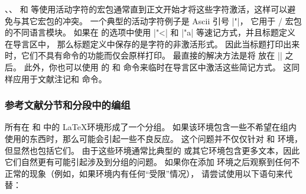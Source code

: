 、、 和  等使用活动字符的宏包通常直到正文开始才将这些字符激活，这样可以避免与其它宏包的冲突。
一个典型的活动字符例子是 Ascii 引号 |"|，
它用于 / 宏包的不同语言模块。
如果在  的选项中使用 |"<| 和 |"a| 等速记方式，并且标题定义在导言区中，
那么标题定义中保存的是字符的非激活形式。
因此当标题打印出来时，它们不具有命令的功能而仅会原样打印。
最直接的解决方法是将  放在  || 之后。
此外，你也可以使用  的  和  命令来临时在导言区中激活这些简记方式。
这同样应用于文献注记和  命令。

\subsubsection{参考文献分节和分段中的编组}%
\label{use:cav:grp}


所有在  和  中的 \LaTeX 环境形成了一个分组。
如果该环境包含一些不希望在组内使用的东西时，那么可能会引起一些不良反应。
这个问题并不仅仅针对  和  环境，但显然也包括它们。
由于这些环境通常比典型的  或其它环境包含更多文本，因此它们自然更有可能引起涉及到分组的问题。
如果你在添加  环境之后观察到任何不正常的现象（例如，如果环境内有任何“受限”情况），
请尝试使用以下语句来代替：

